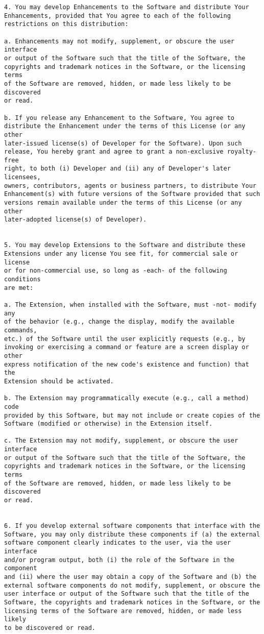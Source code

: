 \documentclass{report}
\begin{document}
{\begin{verbatim}
4. You may develop Enhancements to the Software and distribute Your 
Enhancements, provided that You agree to each of the following 
restrictions on this distribution:

a. Enhancements may not modify, supplement, or obscure the user interface 
or output of the Software such that the title of the Software, the 
copyrights and trademark notices in the Software, or the licensing terms 
of the Software are removed, hidden, or made less likely to be discovered 
or read. 

b. If you release any Enhancement to the Software, You agree to 
distribute the Enhancement under the terms of this License (or any other 
later-issued license(s) of Developer for the Software). Upon such 
release, You hereby grant and agree to grant a non-exclusive royalty-free 
right, to both (i) Developer and (ii) any of Developer's later licensees, 
owners, contributors, agents or business partners, to distribute Your 
Enhancement(s) with future versions of the Software provided that such 
versions remain available under the terms of this License (or any other 
later-adopted license(s) of Developer). 


5. You may develop Extensions to the Software and distribute these 
Extensions under any license You see fit, for commercial sale or license 
or for non-commercial use, so long as -each- of the following conditions 
are met: 

a. The Extension, when installed with the Software, must -not- modify any 
of the behavior (e.g., change the display, modify the available commands, 
etc.) of the Software until the user explicitly requests (e.g., by 
invoking or exercising a command or feature are a screen display or other 
express notification of the new code's existence and function) that the 
Extension should be activated. 

b. The Extension may programmatically execute (e.g., call a method) code 
provided by this Software, but may not include or create copies of the 
Software (modified or otherwise) in the Extension itself. 

c. The Extension may not modify, supplement, or obscure the user interface 
or output of the Software such that the title of the Software, the 
copyrights and trademark notices in the Software, or the licensing terms 
of the Software are removed, hidden, or made less likely to be discovered 
or read.


6. If you develop external software components that interface with the 
Software, you may only distribute these components if (a) the external 
software component clearly indicates to the user, via the user interface 
and/or program output, both (i) the role of the Software in the component 
and (ii) where the user may obtain a copy of the Software and (b) the 
external software components do not modify, supplement, or obscure the 
user interface or output of the Software such that the title of the 
Software, the copyrights and trademark notices in the Software, or the 
licensing terms of the Software are removed, hidden, or made less likely 
to be discovered or read.



\end{verbatim}}
\end{document}
